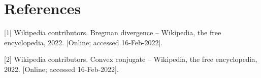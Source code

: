 \documentclass[11pt]{article}
\begin{document}



\section*{References}

[1] Wikipedia contributors. Bregman divergence -- Wikipedia, the free encyclopedia, 2022. [Online; accessed 16-Feb-2022].

[2] Wikipedia contributors. Convex conjugate -- Wikipedia, the free encyclopedia, 2022. [Online; accessed 16-Feb-2022].
{


}
\end{document}
